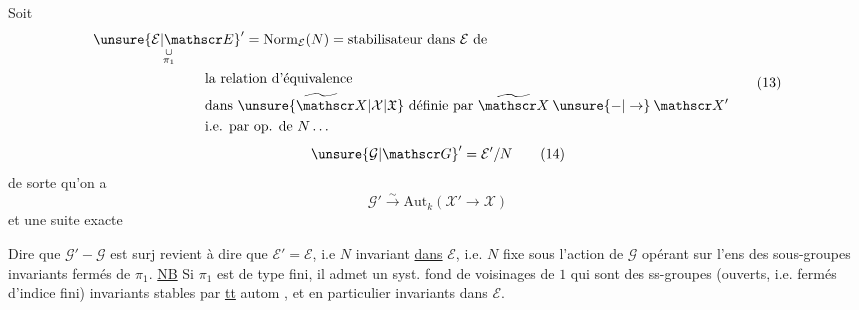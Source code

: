 Soit
\[
\begin{aligned}
&\underset{\substack{\cup\\\pi_1}}{\unsure{\mathcal E|\mathscr E}'}=\mathrm{Norm}_{\mathcal E}(N)=\text{stabilisateur dans }\mathcal E\text{ de}\\
&\hspace{8em}\text{la relation d’équivalence}\\
&\hspace{8em}\text{dans }\widetilde{\unsure{\mathscr X|\mathcal X|\mathfrak X}}\text{ définie par }\widetilde{\mathscr X}\mathbin{\unsure{-|\to}}\mathscr X'\\
&\hspace{8em}\text{i.e. par op. de }N\ldots
\end{aligned}\tag*{(13)}
\]
\[
\unsure{\mathcal G|\mathscr G}'=\mathcal E'/N\tag*{(14)}
\]
de sorte qu’on a
\[
\mathcal G'\xrightarrow{\sim}\mathrm{Aut}_{k}(\mathscr X'\longrightarrow\mathscr X)\tag*{(15)}
\]
et une suite exacte

Dire que $\mathcal G'\mathbin{-}\mathcal G$ est surj revient à dire \margin{\unsure{$-$}} que  $\mathcal E'=\mathcal E$, i.e $N$ invariant \uline{dans} $\mathcal E$, i.e. $N$  fixe sous l’action de $\mathcal G$  opérant sur l’ens des sous-groupes invariants fermés de $\pi_1$. \uline{NB} Si $\pi_1$ est  de type fini, il admet un syst. fond de voisinages de $1$ qui sont des ss-groupes (ouverts, i.e. fermés d’indice fini) invariants stables par \uline{tt} autom , et en particulier  invariants dans $\mathcal E$.


